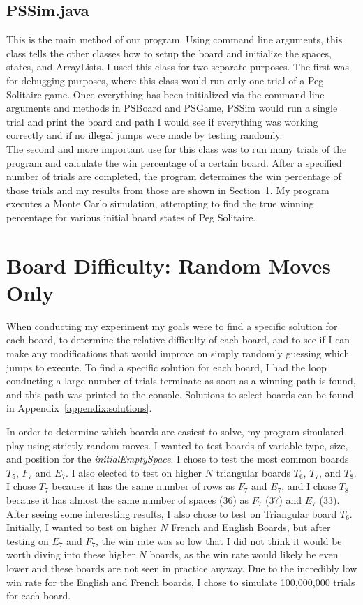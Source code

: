 \documentclass{article}
\newcommand\tab[1][.5cm]{\hspace*{#1}}
\begin{document}
\subsection{PSSim.java}
This is the main method of our program. Using command line arguments, this class tells the other classes how to setup the board and initialize the spaces, states, and ArrayLists. I used this class for two separate purposes. The first was for debugging purposes, where this class would run only one trial of a Peg Solitaire game. Once everything has been initialized via the command line arguments and methods in PSBoard and PSGame, PSSim would run a single trial and print the board and path I would see if everything was working correctly and if no illegal jumps were made by testing randomly.\\
\tab The second and more important use for this class was to run many trials of the program and calculate the win percentage of a certain board. After a specified number of trials are completed, the program determines the win percentage of those trials and my results from those are shown in Section~\ref{sec3}. My program executes a Monte Carlo simulation, attempting to find the true winning percentage for various initial board states of Peg Solitaire.

\section{Board Difficulty: Random Moves Only}
\label{sec3}
When conducting my experiment my goals were to find a specific solution for each board, to determine the relative difficulty of each board, and to see if I can make any modifications that would improve on simply randomly guessing which jumps to execute. To find a specific solution for each board, I had the loop conducting a large number of trials terminate as soon as a winning path is found, and this path was printed to the console. Solutions to select boards can be found in Appendix~\ref{appendix:solutions}.

In order to determine which boards are easiest to solve, my program simulated play using strictly random moves. I wanted to test boards of variable type, size, and position for the \textit{initialEmptySpace}. I chose to test the most common boards $T_5$, $F_7$ and $E_7$. I also elected to test on higher $N$ triangular boards $T_6$, $T_7$, and $T_8$. I chose $T_7$ because it has the same number of rows as $F_7$ and $E_7$, and I chose $T_8$ because it has almost the same number of spaces (36) as $F_7$ (37) and $E_7$ (33). After seeing some interesting results, I also chose to test on Triangular board $T_6$. Initially, I wanted to test on higher $N$ French and English Boards, but after testing on $E_7$ and $F_7$, the win rate was so low that I did not think it would be worth diving into these higher $N$ boards, as the win rate would likely be even lower and these boards are not seen in practice anyway. Due to the incredibly low win rate for the English and French boards, I chose to simulate 100,000,000 trials for each board.
\end{document}

